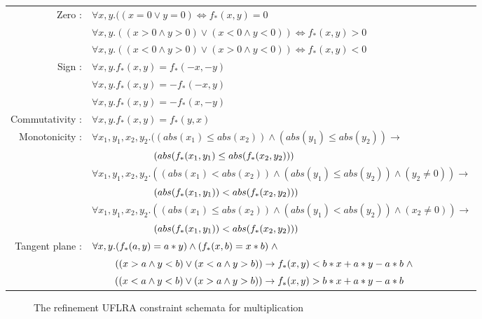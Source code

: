 \vspace*{40px}
\begin{table}[!ht]
\centering
\def\arraystretch{2.5}
\begin{tabular}{rl}
Zero :          & $\forall x, y. ((x = 0 \vee y = 0) \Leftrightarrow f_{\ast}(x, y) = 0$  \\
               & $\forall x, y. ((x > 0 \wedge y > 0) \vee (x < 0 \wedge y < 0)) \Leftrightarrow f_{\ast}(x, y) > 0$  \\
               & $\forall x, y. ((x < 0 \wedge y > 0) \vee (x > 0 \wedge y < 0)) \Leftrightarrow f_{\ast}(x, y) < 0$  \\
Sign :          & $\forall x, y. f_{\ast}(x, y) = f_{\ast}(-x, -y)$ \\
               & $\forall x, y. f_{\ast}(x, y) = -f_{\ast}(-x, y)$  \\
               & $\forall x, y. f_{\ast}(x, y) = -f_{\ast}(x, -y)$  \\
Commutativity : & $\forall x, y. f_{\ast}(x, y) = f_{\ast}(y, x)$  \\
Monotonicity :  & $\forall x_{1}, y_{1}, x_{2}, y_{2}. ((abs(x_{1}) \leq abs(x_{2})) \wedge (abs(y_{1}) \leq abs(y_{2})) \to$  \\
                & $\hspace{22mm}(abs(f_{\ast}(x_{1}, y_{1}) \leq abs(f_{\ast}(x_{2}, y_{2})))$  \\
                & $\forall x_{1}, y_{1}, x_{2}, y_{2}. ((abs(x_{1}) < abs(x_{2})) \wedge (abs(y_{1}) \leq abs(y_{2})) \wedge (y_{2} \neq 0)) \to$  \\
                &  $\hspace{22mm}(abs(f_{\ast}(x_{1}, y_{1})) < abs(f_{\ast}(x_{2}, y_{2})))$ \\
               & $\forall x_{1}, y_{1}, x_{2}, y_{2}. ((abs(x_{1}) \leq abs(x_{2})) \wedge (abs(y_{1}) < abs(y_{2})) \wedge (x_{2} \neq 0)) \to$ \\
               & $\hspace{22mm}(abs(f_{\ast}(x_{1}, y_{1})) < abs(f_{\ast}(x_{2}, y_{2})))$ \\
Tangent plane : & $\forall x, y. (f_{\ast}(a, y) = a \ast y) \wedge (f_{\ast}(x, b) = x \ast b) \hspace{1mm}\wedge$ \\
               & $\hspace{8mm}((x > a \wedge y < b) \vee (x < a \wedge y > b)) \to f_{\ast}(x, y) < b \ast x + a \ast y - a \ast b \hspace{1mm}\wedge$ \\
               & $\hspace{8mm}((x < a \wedge y < b) \vee (x > a \wedge y > b)) \to f_{\ast}(x, y) >  b \ast x + a \ast y - a \ast b$
\end{tabular}
\end{table}
\begin{figure}[ht!]
\caption{The refinement UFLRA constraint schemata for multiplication \cite{Cimatti:2018:ILS:3274693.3230639}}
\label{fig:Constraint_Schemata_For_Multiplication}
\end{figure}\newpage

